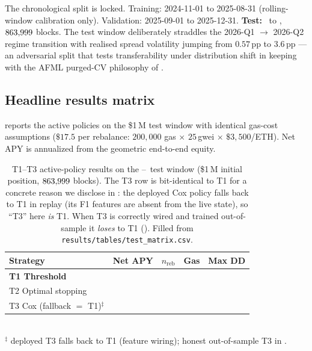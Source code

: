 The chronological split is locked.  Training: 2024-11-01 to
2025-08-31 (rolling-window calibration only).  Validation:
2025-09-01 to 2025-12-31.  \textbf{Test:} \DataStart\ to \DataEnd,
$863{,}999$ blocks.  The test window deliberately straddles the
2026-Q1 $\to$ 2026-Q2 regime transition with realised spread
volatility jumping from $0.57$\,pp to $3.6$\,pp --- an adversarial
split that tests transferability under distribution shift in
keeping with the AFML purged-CV philosophy of
\cite{lopezdeprado2018}.

\subsection{Headline results matrix}
\label{sec:emp-results}

 reports the active policies on the \$1\,M
test window with identical gas-cost assumptions ($\$17.5$ per
rebalance: $200{,}000$ gas $\times$ $25$\,gwei $\times$
$\$3{,}500$/ETH).  Net APY is annualized from the geometric
end-to-end equity.

\begin{table}[t]
  \centering
  \caption{T1--T3 active-policy results on the \DataStart--\DataEnd\
    test window (\$1\,M initial position, $863{,}999$ blocks).  The
    T3 row is bit-identical to T1 for a concrete reason we disclose
    in \Cref{sec:emp-t3neg}: the deployed Cox policy falls back to
    T1 in replay (its F1 features are absent from the live state),
    so ``T3'' here \emph{is} T1.  When T3 is correctly wired and
    trained out-of-sample it \emph{loses} to T1 ().
    Filled from \texttt{results/tables/test\_matrix.csv}.}
  \label{tab:test-matrix}
  \setlength{\tabcolsep}{4pt}
  \begin{tabular}{lrrrr}
    \toprule
    Strategy & Net APY & $n_{\text{reb}}$ & Gas & Max DD \\
    \midrule
    \textbf{T1 Threshold}  & \textbf{\TOneAPY}   & \TOneNRebal            & \TOneGasUSD            & \TOneMaxDD \\
    T2 Optimal stopping    & \TTwoAPY            & \TTwoNRebal            & \TTwoGasUSD            & \TTwoMaxDD \\
    T3 Cox (fallback $=$ T1)$^{\ddagger}$ & \TThreeAPY  & \TThreeNRebal          & \TThreeGasUSD          & \TThreeMaxDD \\
    \bottomrule
  \end{tabular}\\[2pt]
  {\footnotesize $^{\ddagger}$ deployed T3 falls back to T1 (feature
   wiring); honest out-of-sample T3 in \Cref{tab:wf-t3-vs-t1}.}
\end{table}

